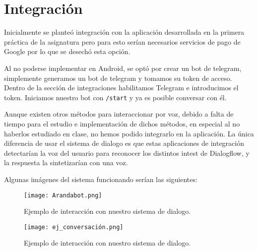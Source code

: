 \section{Integración}

Inicialmente se planteó integración con la aplicación desarrollada en la primera práctica de la asignatura pero para esto serían necesarios servicios de pago de Google por lo que se desechó esta opción.

Al no poderse implementar en Android, se optó por crear un bot de telegram, simplemente generamos un bot de telegram y tomamos su token de acceso. Dentro de la sección de integraciones habilitamos Telegram e introducimos el token. Iniciamos nuestro bot con \texttt{/start} y ya es posible conversar con él.

Aunque existen otros métodos para interaccionar por voz, debido a falta de tiempo para el estudio e implementación de dichos métodos, en especial al no haberlos estudiado en clase, no hemos podido integrarlo en la aplicación. La única diferencia de usar el sistema de dialogo es que estas aplicaciones de integración detectarían la voz del usuario para reconocer los distintos intest de Dialogflow, y la respuesta la sintetizarían con una voz.

Algunas imágenes del sistema funcionando serían las siguientes:

\begin{figure}[H]
  \centering
      \texttt{[image: Arandabot.png]}
 		\caption{Ejemplo de interacción con nuestro sistema de dialogo.}
\end{figure}


\begin{figure}[H]
  \centering
      \texttt{[image: ej\_conversación.png]}
 		\caption{Ejemplo de interacción con nuestro sistema de dialogo.}
\end{figure}

